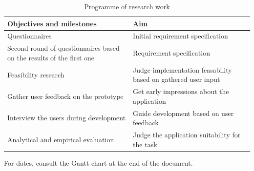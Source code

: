 \documentclass[10pt,a4paper,oneside]{report}
\begin{document}
\begin{table}[H]
\begin{tabularx}{\textwidth}{ |S|S| }
  \hline
  \bf{Objectives and milestones} & \bf{Aim} \\ \hline
  Questionnaires & Initial requirement specification \\ \hline
  Second round of questionnaires based on the results of the first one & Requirement specification \\ \hline
  Feasibility research & Judge implementation feasability based on gathered user input  \\ \hline
  Gather user feedback on the prototype & Get early impressions about the application  \\ \hline
  Interview the users during development & Guide development based on user feedback  \\ \hline
  Analytical and empirical evaluation & Judge the application suitability for the task \\ \hline
\end{tabularx}
\caption{Programme of research work}
\end{table}

For dates, consult the Gantt chart at the end of the document.
\end{document}
